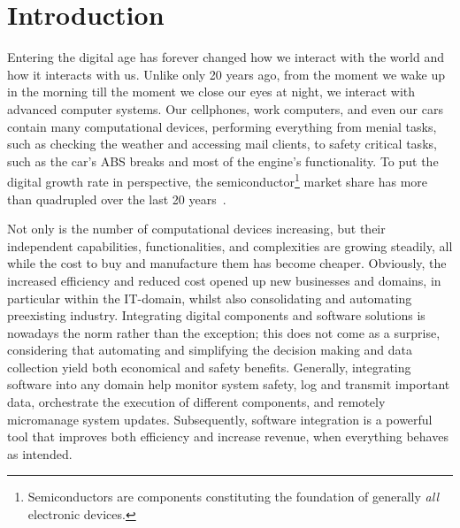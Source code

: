 \chapter{Introduction}%
\label{ch:intro}%
Entering the digital age has forever changed how we interact with the world and how it interacts with us.
Unlike only 20 years ago, from the moment we wake up in the morning till the moment we close our eyes at night, we interact with advanced computer systems.
Our cellphones, work computers, and even our cars contain many computational devices, performing everything from menial tasks, such as checking the weather and accessing mail clients, to safety critical tasks, such as the car's ABS breaks and most of the engine's functionality.
To put the digital growth rate in perspective, the semiconductor\footnote{Semiconductors are components constituting the foundation of generally \emph{all} electronic devices.} market share has more than quadrupled over the last 20 years~\cite{statista:2022}.

Not only is the number of computational devices increasing, but their independent capabilities, functionalities, and complexities are growing steadily, all while the cost to buy and manufacture them has become cheaper.
Obviously, the increased efficiency and reduced cost opened up new businesses and domains, in particular within the IT-domain, whilst also consolidating and automating preexisting industry.
Integrating digital components and software solutions is nowadays the norm rather than the exception; this does not come as a surprise, considering that automating and simplifying the decision making and data collection yield both economical and safety benefits.
Generally, integrating software into any domain help monitor system safety, log and transmit important data, orchestrate the execution of different components, and remotely micromanage system updates.
Subsequently, software integration is a powerful tool that improves both efficiency and increase revenue, when everything behaves as intended.

